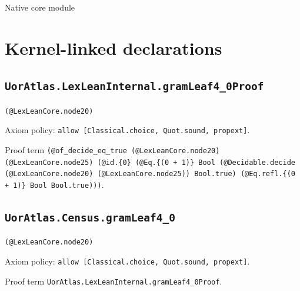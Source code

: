 \documentclass[11pt]{article}
\begin{document}
\begin{center}{\LARGE Native core module}\end{center}
\section*{Kernel-linked declarations}
\subsection*{\texttt{UorAtlas.LexLeanInternal.gramLeaf4\_0Proof}}
\noindent\texttt{(@LexLeanCore.node20)}\par
\noindent Axiom policy: \texttt{allow [Classical.choice, Quot.sound, propext]}.\par
\noindent Proof term \texttt{(@of\_decide\_eq\_true (@LexLeanCore.node20) (@LexLeanCore.node25) (@id.\{0\} (@Eq.\{(0 + 1)\} Bool (@Decidable.decide (@LexLeanCore.node20) (@LexLeanCore.node25)) Bool.true) (@Eq.refl.\{(0 + 1)\} Bool Bool.true)))}.\par
\subsection*{\texttt{UorAtlas.Census.gramLeaf4\_0}}
\noindent\texttt{(@LexLeanCore.node20)}\par
\noindent Axiom policy: \texttt{allow [Classical.choice, Quot.sound, propext]}.\par
\noindent Proof term \texttt{UorAtlas.LexLeanInternal.gramLeaf4\_0Proof}.\par
\end{document}

